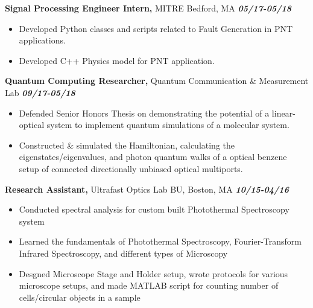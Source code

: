 \documentclass[margin]{res}
\begin{document}
\begin{resume}
{\bf Signal Processing Engineer Intern,} MITRE Bedford, MA \hfill \textbf{\textit{05/17-05/18}}
 \begin{itemize}  pt  %
 \item Developed Python classes and scripts related to Fault Generation in PNT applications.
 \item Developed C++ Physics model for PNT application.
 \end{itemize}



{\bf Quantum Computing Researcher,} Quantum Communication \& Measurement Lab \hfill  \textbf{\textit{09/17-05/18}}
\begin{itemize}  pt
\item Defended Senior Honors Thesis on demonstrating the potential of a linear-optical system to implement quantum simulations of a molecular system.
\item Constructed \& simulated the Hamiltonian, calculating the eigenstates/eigenvalues, and photon quantum walks of a optical benzene setup of connected directionally unbiased optical multiports.
\end{itemize}



 



{\bf Research Assistant,} Ultrafast Optics Lab BU, Boston, MA \hfill \textbf{\textit{10/15-04/16}}
			\begin{itemize} \itemsep -2pt
			\item  Conducted spectral analysis for custom built Photothermal Spectroscopy system
			\item Learned the fundamentals of Photothermal Spectroscopy, Fourier-Transform Infrared Spectroscopy, and different types of Microscopy 
			\item Desgned Microscope Stage and Holder setup, wrote protocols for various microscope setups, and made MATLAB script for counting number of cells/circular objects in a sample
			\end{itemize}
			

\end{resume}
\end{document}
